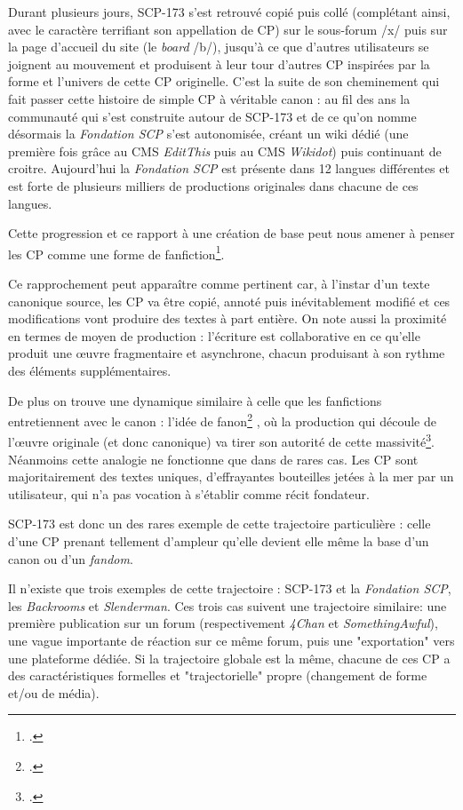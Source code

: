 \documentclass[12pt,a4paper,oneside,titlepage]{book} %
\begin{document}
	Durant plusieurs jours, SCP-173 s'est retrouvé copié puis collé (complétant ainsi, avec le caractère terrifiant son appellation de CP) sur le sous-forum /x/ puis sur la page d'accueil du site (le \textit{board} /b/), jusqu'à ce que d'autres utilisateurs se joignent au mouvement et produisent à leur tour d'autres CP inspirées par la forme et l'univers de cette CP originelle.
	C'est la suite de son cheminement qui fait passer cette histoire de simple CP à véritable canon : au fil des ans la communauté qui s'est construite autour de SCP-173 et de ce qu'on nomme désormais la \emph{Fondation SCP} s'est autonomisée, créant un wiki dédié (une première fois grâce au CMS \emph{EditThis} puis au CMS \emph{Wikidot}) puis continuant de croitre. Aujourd’hui la \emph{Fondation SCP} est présente dans 12 langues différentes et est forte de plusieurs milliers de productions originales dans chacune de ces langues. 
	
	Cette progression et ce rapport à une création de base peut nous amener à penser les CP comme une forme de fanfiction\footcite[voir p. 2]{goudet_agentivite_2021}.
	
	Ce rapprochement peut apparaître comme pertinent car, à l'instar d'un texte canonique source, les CP va être copié, annoté puis inévitablement modifié et ces modifications vont produire des textes à part entière. On note aussi la proximité en termes de moyen de production : l'écriture est collaborative en ce qu'elle produit une œuvre fragmentaire et asynchrone, chacun produisant à son rythme des éléments supplémentaires.
	
	De plus on trouve une dynamique similaire à celle que les fanfictions entretiennent avec le canon : l'idée de fanon\footcite{lata_du_2022} , où la production qui découle de l'œuvre originale (et donc canonique) va tirer son autorité de cette massivité\footcite{cook_canonicity_2013}. 
	Néanmoins cette analogie ne fonctionne que dans de rares cas. Les CP sont majoritairement des textes uniques, d'effrayantes bouteilles jetées à la mer par un utilisateur, qui n'a pas vocation à s'établir comme récit fondateur. 
	
	SCP-173 est donc un des rares exemple de cette trajectoire particulière : celle d'une CP prenant tellement d'ampleur qu'elle devient elle même la base d'un canon ou d'un \textit{fandom}. 

	
	Il n'existe que trois exemples de cette trajectoire : SCP-173 et la \emph{Fondation SCP}, les \emph{Backrooms} et \emph{Slenderman}. 
	Ces trois cas suivent une trajectoire similaire: une première publication sur un forum (respectivement \emph{4Chan} et \emph{SomethingAwful}), une vague importante de réaction sur ce même forum, puis une "exportation" vers une plateforme dédiée. Si la trajectoire globale est la même, chacune de ces CP a des caractéristiques formelles et "trajectorielle" propre (changement de forme et/ou de média).
	
\end{document}
